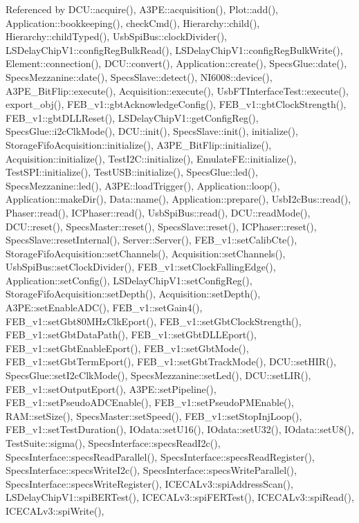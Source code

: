 Referenced by D\+C\+U\+::acquire(), A3\+P\+E\+::acquisition(), Plot\+::add(), Application\+::bookkeeping(), check\+Cmd(), Hierarchy\+::child(), Hierarchy\+::child\+Typed(), Usb\+Spi\+Bus\+::clock\+Divider(), L\+S\+Delay\+Chip\+V1\+::config\+Reg\+Bulk\+Read(), L\+S\+Delay\+Chip\+V1\+::config\+Reg\+Bulk\+Write(), Element\+::connection(), D\+C\+U\+::convert(), Application\+::create(), Specs\+Glue\+::date(), Specs\+Mezzanine\+::date(), Specs\+Slave\+::detect(), N\+I6008\+::device(), A3\+P\+E\+\_\+\+Bit\+Flip\+::execute(), Acquisition\+::execute(), Usb\+F\+T\+Interface\+Test\+::execute(), export\+\_\+obj(), F\+E\+B\+\_\+v1\+::gbt\+Acknowledge\+Config(), F\+E\+B\+\_\+v1\+::gbt\+Clock\+Strength(), F\+E\+B\+\_\+v1\+::gbt\+D\+L\+L\+Reset(), L\+S\+Delay\+Chip\+V1\+::get\+Config\+Reg(), Specs\+Glue\+::i2c\+Clk\+Mode(), D\+C\+U\+::init(), Specs\+Slave\+::init(), initialize(), Storage\+Fifo\+Acquisition\+::initialize(), A3\+P\+E\+\_\+\+Bit\+Flip\+::initialize(), Acquisition\+::initialize(), Test\+I2\+C\+::initialize(), Emulate\+F\+E\+::initialize(), Test\+S\+P\+I\+::initialize(), Test\+U\+S\+B\+::initialize(), Specs\+Glue\+::led(), Specs\+Mezzanine\+::led(), A3\+P\+E\+::load\+Trigger(), Application\+::loop(), Application\+::make\+Dir(), Data\+::name(), Application\+::prepare(), Usb\+I2c\+Bus\+::read(), Phaser\+::read(), I\+C\+Phaser\+::read(), Usb\+Spi\+Bus\+::read(), D\+C\+U\+::read\+Mode(), D\+C\+U\+::reset(), Specs\+Master\+::reset(), Specs\+Slave\+::reset(), I\+C\+Phaser\+::reset(), Specs\+Slave\+::reset\+Internal(), Server\+::\+Server(), F\+E\+B\+\_\+v1\+::set\+Calib\+Cte(), Storage\+Fifo\+Acquisition\+::set\+Channels(), Acquisition\+::set\+Channels(), Usb\+Spi\+Bus\+::set\+Clock\+Divider(), F\+E\+B\+\_\+v1\+::set\+Clock\+Falling\+Edge(), Application\+::set\+Config(), L\+S\+Delay\+Chip\+V1\+::set\+Config\+Reg(), Storage\+Fifo\+Acquisition\+::set\+Depth(), Acquisition\+::set\+Depth(), A3\+P\+E\+::set\+Enable\+A\+D\+C(), F\+E\+B\+\_\+v1\+::set\+Gain4(), F\+E\+B\+\_\+v1\+::set\+Gbt80\+M\+Hz\+Clk\+Eport(), F\+E\+B\+\_\+v1\+::set\+Gbt\+Clock\+Strength(), F\+E\+B\+\_\+v1\+::set\+Gbt\+Data\+Path(), F\+E\+B\+\_\+v1\+::set\+Gbt\+D\+L\+L\+Eport(), F\+E\+B\+\_\+v1\+::set\+Gbt\+Enable\+Eport(), F\+E\+B\+\_\+v1\+::set\+Gbt\+Mode(), F\+E\+B\+\_\+v1\+::set\+Gbt\+Term\+Eport(), F\+E\+B\+\_\+v1\+::set\+Gbt\+Track\+Mode(), D\+C\+U\+::set\+H\+I\+R(), Specs\+Glue\+::set\+I2c\+Clk\+Mode(), Specs\+Mezzanine\+::set\+Led(), D\+C\+U\+::set\+L\+I\+R(), F\+E\+B\+\_\+v1\+::set\+Output\+Eport(), A3\+P\+E\+::set\+Pipeline(), F\+E\+B\+\_\+v1\+::set\+Pseudo\+A\+D\+C\+Enable(), F\+E\+B\+\_\+v1\+::set\+Pseudo\+P\+M\+Enable(), R\+A\+M\+::set\+Size(), Specs\+Master\+::set\+Speed(), F\+E\+B\+\_\+v1\+::set\+Stop\+Inj\+Loop(), F\+E\+B\+\_\+v1\+::set\+Test\+Duration(), I\+Odata\+::set\+U16(), I\+Odata\+::set\+U32(), I\+Odata\+::set\+U8(), Test\+Suite\+::sigma(), Specs\+Interface\+::specs\+Read\+I2c(), Specs\+Interface\+::specs\+Read\+Parallel(), Specs\+Interface\+::specs\+Read\+Register(), Specs\+Interface\+::specs\+Write\+I2c(), Specs\+Interface\+::specs\+Write\+Parallel(), Specs\+Interface\+::specs\+Write\+Register(), I\+C\+E\+C\+A\+Lv3\+::spi\+Address\+Scan(), L\+S\+Delay\+Chip\+V1\+::spi\+B\+E\+R\+Test(), I\+C\+E\+C\+A\+Lv3\+::spi\+F\+E\+R\+Test(), I\+C\+E\+C\+A\+Lv3\+::spi\+Read(), I\+C\+E\+C\+A\+Lv3\+::spi\+Write(), 
